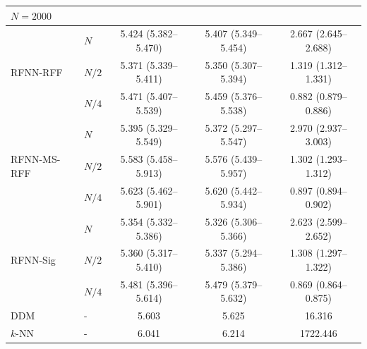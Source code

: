 \documentclass{article}
\begin{document}
\begin{table}[htbp]
\begin{tabular}{@{}llccc@{}}
\midrule
\multicolumn{5}{l}{\textbf{$N=2000$}} \\
\midrule
\midrule

\multirow{3}{*}{RFNN-RFF} 
&	$N$	    & 5.424 (5.382--5.470) & 5.407 (5.349--5.454) & 2.667 (2.645--2.688) \\
&	$N/2$	& 5.371 (5.339--5.411) & 5.350 (5.307--5.394) & 1.319 (1.312--1.331) \\
&	$N/4$	& 5.471 (5.407--5.539) & 5.459 (5.376--5.538) & 0.882 (0.879--0.886) \\
\midrule

\multirow{3}{*}{RFNN-MS-RFF} 
&	$N$	    & 5.395 (5.329--5.549) & 5.372 (5.297--5.547) & 2.970 (2.937--3.003) \\
&	$N/2$	& 5.583 (5.458--5.913) & 5.576 (5.439--5.957) & 1.302 (1.293--1.312) \\
&	$N/4$	& 5.623 (5.462--5.901) & 5.620 (5.442--5.934) & 0.897 (0.894--0.902) \\
\midrule

\multirow{3}{*}{RFNN-Sig} 
&	$N$	    & 5.354 (5.332--5.386) & 5.326 (5.306--5.366) & 2.623 (2.599--2.652) \\
&	$N/2$	& 5.360 (5.317--5.410) & 5.337 (5.294--5.386) & 1.308 (1.297--1.322) \\
&	$N/4$	& 5.481 (5.396--5.614) & 5.479 (5.379--5.632) & 0.869 (0.864--0.875) \\
\midrule

DDM  &	-	& 5.603 & 5.625 & 16.316   \\
$k$-NN &	-	& 6.041 & 6.214 & 1722.446 \\
\bottomrule
\end{tabular}
\end{table}
\end{document}
